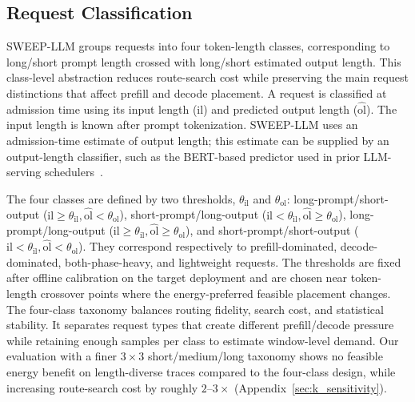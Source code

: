 \subsection{Request Classification}
\label{sec:request_classes}

SWEEP-LLM groups requests into four token-length classes, corresponding to long/short prompt length crossed with long/short estimated output length.
This class-level abstraction reduces route-search cost while preserving the main request distinctions that affect prefill and decode placement.
A request is classified at admission time using its input length ($\mathrm{il}$) and predicted output length ($\widehat{\mathrm{ol}}$).
The input length is known after prompt tokenization.
SWEEP-LLM uses an admission-time estimate of output length; this estimate can be supplied by an output-length classifier, such as the BERT-based predictor used in prior LLM-serving schedulers~\cite{stojkovic2024dynamollm}.

The four classes are defined by two thresholds, $\theta_{\mathrm{il}}$ and $\theta_{\mathrm{ol}}$: long-prompt/short-output ($\mathrm{il} \ge \theta_{\mathrm{il}},\widehat{\mathrm{ol}} < \theta_{\mathrm{ol}}$), short-prompt/long-output ($\mathrm{il} < \theta_{\mathrm{il}},\widehat{\mathrm{ol}} \ge \theta_{\mathrm{ol}}$), long-prompt/long-output ($\mathrm{il} \ge \theta_{\mathrm{il}},\widehat{\mathrm{ol}} \ge \theta_{\mathrm{ol}}$), and short-prompt/short-output ($\mathrm{il} < \theta_{\mathrm{il}},\widehat{\mathrm{ol}} < \theta_{\mathrm{ol}}$).
They correspond respectively to prefill-dominated, decode-dominated, both-phase-heavy, and lightweight requests.
The thresholds are fixed after offline calibration on the target deployment and are chosen near token-length crossover points where the energy-preferred feasible placement changes.
The four-class taxonomy balances routing fidelity, search cost, and statistical stability.
It separates request types that create different prefill/decode pressure while retaining enough samples per class to estimate window-level demand.
Our evaluation with a finer $3{\times}3$ short/medium/long taxonomy shows no feasible energy benefit on length-diverse traces compared to the four-class design, while increasing route-search cost by roughly $2$--$3\times$ (Appendix~\ref{sec:k_sensitivity}).

